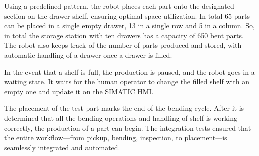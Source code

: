 Using a predefined pattern, the robot places each part onto the designated section on the drawer shelf, ensuring optimal space utilization. In total 65 parts can be placed in a single empty drawer, 13 in a single row and 5 in a column. So, in total the storage station with ten drawers has a capacity of 650 bent parts. The robot also keeps track of the number of parts produced and stored, with automatic handling of a drawer once a drawer is filled.

In the event that a shelf is full, the production is paused, and the robot goes in a waiting state. It waits for the human operator to change the filled shelf with an empty one and update it on the SIMATIC \hyperref[acro:HMI]{HMI}.

The placement of the test part marks the end of the bending cycle. After it is determined that all the bending operations and handling of shelf is working correctly, the production of a part can begin.
The integration tests ensured that the entire workflow—from pickup, bending, inspection, to placement—is seamlessly integrated and automated.



